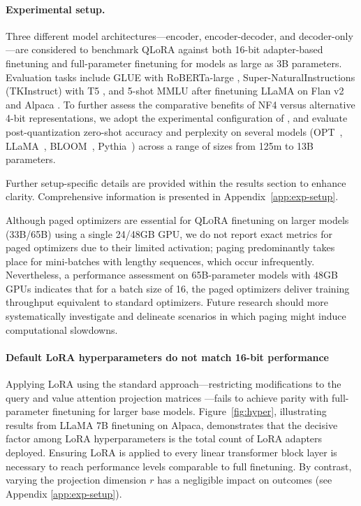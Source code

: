 \paragraph{Experimental setup.} Three different model architectures—encoder, encoder-decoder, and decoder-only—are considered to benchmark QLoRA against both 16-bit adapter-based finetuning and full-parameter finetuning for models as large as 3B parameters. Evaluation tasks include GLUE \citep{wang2018glue} with RoBERTa-large \citep{liu2019roberta}, Super-NaturalInstructions (TKInstruct) \citep{wang2022super} with T5 \citep{t5}, and 5-shot MMLU \citep{hendrycksmeasuring} after finetuning LLaMA on Flan v2 \citep{longpre2023flan} and Alpaca \citep{alpaca}. To further assess the comparative benefits of NF4 versus alternative 4-bit representations, we adopt the experimental configuration of \citet{dettmers2022case}, and evaluate post-quantization zero-shot accuracy and perplexity on several models (OPT~\citep{zhang2022opt}, LLaMA~\citep{touvron2023llama}, BLOOM~\citep{scao2022bloom}, Pythia~\citep{biderman2023pythia}) across a range of sizes from 125m to 13B parameters.

Further setup-specific details are provided within the results section to enhance clarity. Comprehensive information is presented in Appendix~\ref{app:exp-setup}.

Although paged optimizers are essential for \textsc{QLoRA} finetuning on larger models (33B/65B) using a single 24/48GB GPU, we do not report exact metrics for paged optimizers due to their limited activation; paging predominantly takes place for mini-batches with lengthy sequences, which occur infrequently. Nevertheless, a performance assessment on 65B-parameter models with 48GB GPUs indicates that for a batch size of 16, the paged optimizers deliver training throughput equivalent to standard optimizers. Future research should more systematically investigate and delineate scenarios in which paging might induce computational slowdowns.

\paragraph{Default LoRA hyperparameters do not match 16-bit performance} 

Applying LoRA using the standard approach—restricting modifications to the query and value attention projection matrices \citep{hu2021lora}—fails to achieve parity with full-parameter finetuning for larger base models. Figure~\ref{fig:hyper}, illustrating results from LLaMA 7B finetuning on Alpaca, demonstrates that the decisive factor among LoRA hyperparameters is the total count of LoRA adapters deployed. Ensuring LoRA is applied to every linear transformer block layer is necessary to reach performance levels comparable to full finetuning. By contrast, varying the projection dimension $r$ has a negligible impact on outcomes (see Appendix \ref{app:exp-setup}).

